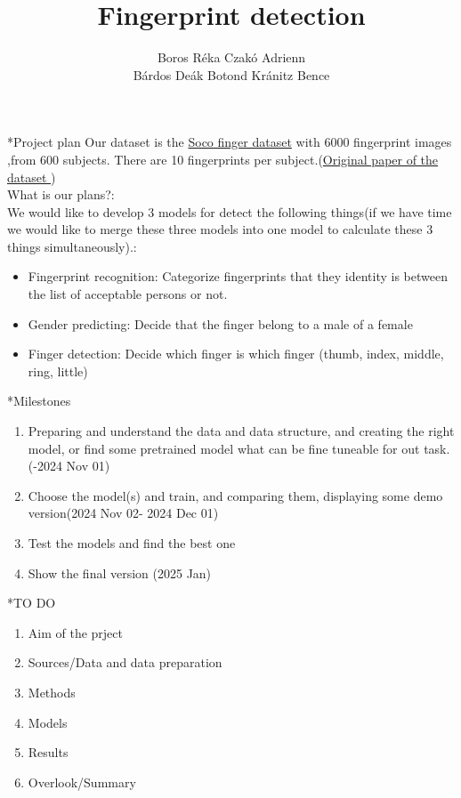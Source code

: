 \documentclass[]{scrartcl}
\title{Fingerprint detection}
\author{Boros Réka \quad 	Czakó Adrienn 	\\Bárdos Deák Botond \quad	Kránitz Bence}
\begin{document}
	\maketitle
\begin{section}*{Project plan}
	Our dataset is the  \href{https://www.kaggle.com/datasets/ruizgara/socofing}{Soco finger dataset} with 6000 fingerprint images ,from 600 subjects. There are 10 fingerprints per subject.(\href{https://arxiv.org/pdf/1807.10609}{Original paper of the dataset })
	\\What is our plans?:\\We would like to develop 3 models for detect the following things(if we have time we would like to merge these three models into one model to calculate these 3 things simultaneously).:
	\begin{itemize}
		\item Fingerprint recognition: Categorize fingerprints that they identity is between the list of acceptable persons or not.
		\item Gender predicting: Decide that the finger belong to a male of a female
		\item Finger detection: Decide which finger is which finger (thumb, index, middle, ring, little)
	\end{itemize}
\end{section}

\begin{section}*{Milestones}
	\begin{enumerate}
		\item Preparing and understand the data and data structure, and creating the right model, or find some pretrained model what can be fine tuneable for out task. \quad(-2024 Nov 01)
		\item Choose the model(s) and train, and comparing them, displaying some demo version\quad (2024 Nov 02- 2024 Dec 01)
		\item Test the models and find the best one
		\item Show the final version (2025 Jan)
	\end{enumerate}

\end{section}
\begin{section}*{TO DO}
	\begin{enumerate}
		\item Aim of the prject
  		\item Sources/Data and data preparation
    		\item Methods
      		\item Models
		\item Results
  		\item Overlook/Summary
	\end{enumerate}

\end{section}
\end{document}
